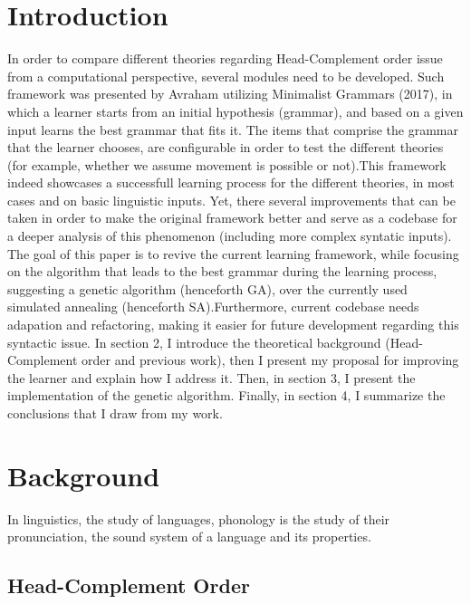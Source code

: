 \documentclass{article}
\begin{document}
\section{Introduction} 
In order to compare different theories regarding Head-Complement order issue from a computational perspective, several modules need to be developed. Such framework was presented by Avraham utilizing Minimalist Grammars (2017),  in which a learner starts from an initial hypothesis (grammar), and based on a given input learns the best grammar that fits it. The items that comprise the grammar that the learner chooses, are configurable in order to test the different theories (for example, whether we assume movement is possible or not).This framework indeed showcases a successfull learning process for the different theories, in most cases and on basic linguistic inputs. Yet,  there several improvements that can be taken in order to make the original framework better and serve as a codebase for a deeper analysis of this phenomenon (including more complex syntatic inputs). \\

The goal of this paper is to revive the current learning framework, while focusing on the algorithm that leads to the best grammar during the learning process, suggesting a genetic algorithm (henceforth GA), over the currently used simulated annealing (henceforth SA).Furthermore, current codebase needs adapation and refactoring, making it easier for future development regarding this syntactic issue.
In section 2, I introduce the theoretical background (Head-Complement order and previous work),  then I present my proposal for improving the learner and explain how I address it.  Then,  in section 3,  I present the implementation of the genetic algorithm. Finally,  in section 4,  I summarize the conclusions that I draw from my work.

\clearpage
\section{Background} 
In linguistics, the study of languages, phonology is the study of their pronunciation,  the sound system of a language and its properties.

\subsection{Head-Complement Order} %
\end{document}
